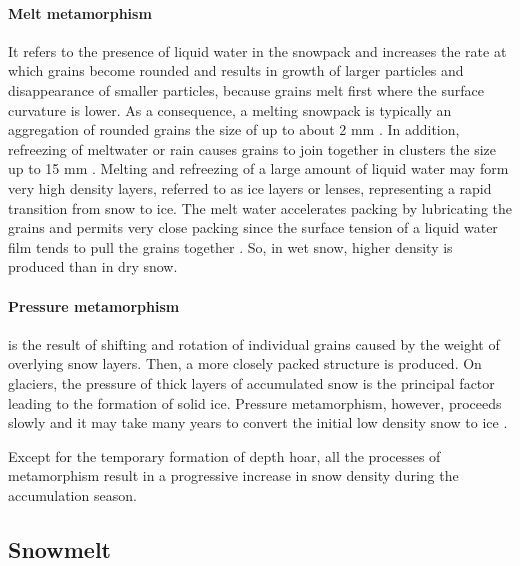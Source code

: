 \paragraph{Melt metamorphism} It refers to the presence of liquid water in the snowpack and increases the rate at which grains become rounded and results in growth of larger particles and disappearance of smaller particles, because grains melt first where the surface curvature is lower. As a consequence, a melting snowpack is typically an aggregation of rounded grains the size of up to about 2 mm \citep{Colbeck78}. In addition, refreezing of meltwater or rain causes grains to join together in clusters the size up to 15 mm \citep{Alford74}. Melting and refreezing of a large amount of liquid water may form very high density layers, referred to as ice layers or lenses, representing a rapid transition from snow to ice. The melt water accelerates packing by lubricating the grains and permits very close packing since the surface tension of a liquid water film tends to pull the grains together \citep{Singh01}. So, in wet snow, higher density is produced than in dry snow. 

\paragraph{Pressure metamorphism} is the result of shifting and rotation of individual grains caused by the weight of overlying snow layers. Then, a more closely packed structure is produced. On glaciers, the pressure of thick layers of accumulated snow is the principal factor leading to the formation of solid ice. Pressure metamorphism, however, proceeds slowly and it may take many years to convert the initial low density snow to ice \citep{Alford74}.

\vspace{0.5cm}
\noindent Except for the temporary formation of depth hoar, all the processes of metamorphism result in a progressive increase in snow density during the accumulation season.

\subsection{Snowmelt}

